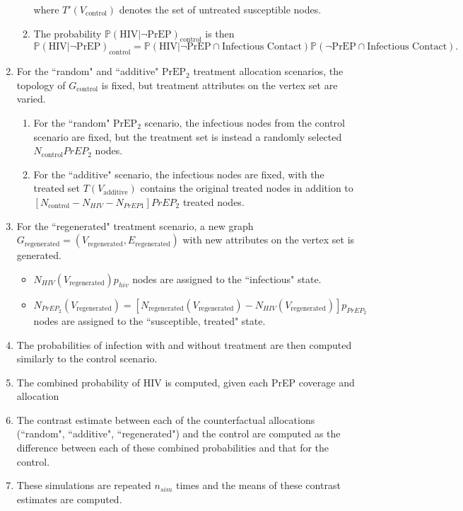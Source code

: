 \documentclass{article}
\theoremstyle{definition}
\begin{document}
\begin{enumerate}
\begin{enumerate}
    where $T'\left(V_{\text{control}}\right)$ denotes the set of untreated susceptible nodes.
    \item The probability $\mathbb{P}\left(\text{HIV} \vert \neg \text{PrEP}\right)_{\text{control}}$ is then
    \begin{equation}
        \mathbb{P}\left(\text{HIV} \vert \neg \text{PrEP}\right)_{\text{control}}=\mathbb{P}\left(\text{HIV} \vert \neg \text{PrEP} \cap \text{Infectious Contact}\right) \mathbb{P}\left( \neg \text{PrEP} \cap \text{Infectious Contact}\right).\nonumber
    \end{equation}
    \end{enumerate}
    \item For the ``random" and ``additive" $\text{PrEP}_{2}$ treatment allocation  scenarios, the topology of $G_{\text{control}}$ is fixed, but treatment attributes on the vertex set are varied. 
    \begin{enumerate}
        \item For the ``random" $\text{PrEP}_{2}$ scenario, the infectious nodes from the control scenario are fixed, but the treatment set is instead a randomly selected $N_{\text{control}}PrEP_{2}$ nodes.
        \item For the ``additive" scenario, the infectious nodes are fixed, with the treated set $T\left(V_{\text{additive}}\right)$ contains the original treated nodes in addition to $\left[N_{\text{control}}-N_{HIV}-N_{PrEP1}\right]PrEP_{2}$ treated nodes.
    \end{enumerate}
    \item For the ``regenerated" treatment scenario, a new graph $G_{\text{regenerated}}=\left(V_{ \text{regenerated}},E_{\text{regenerated}}\right)$ with new attributes on the vertex set is generated.
    \begin{itemize}
        \item $N_{HIV}\left(V_{\text{regenerated}}\right)p_{hiv}$ nodes are assigned to the ``infectious" state.
        \item $N_{PrEP_{2}}\left(V_{\text{regenerated}}\right)=\left[N_{\text{regenerated}}\left(V_{\text{regenerated}}\right)-N_{HIV}\left(V_{\text{regenerated}}\right)\right]p_{PrEP_{2}}$ nodes are assigned to the ``susceptible, treated" state. 
    \end{itemize}
    \item The probabilities of infection with and without treatment are then computed similarly to the control scenario.
    \item The combined probability of HIV is computed, given each PrEP coverage and allocation
    \item The contrast estimate between each of the counterfactual allocations (``random", ``additive", ``regenerated") and the control are computed as the difference  between each of these combined probabilities and that for the control.
    \item These simulations are repeated $n_{sim}$ times and the means of these contrast estimates are computed.
\end{enumerate}
\end{document}
